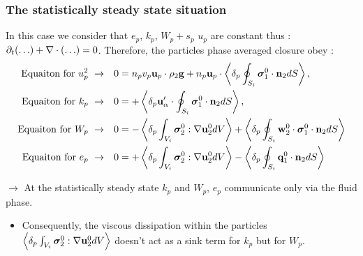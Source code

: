 \documentclass{sintefbeamer}
\begin{document}
\begin{frame}
  \frametitle{The statistically steady state situation}
In this case we consider that $e_p$, $k_p$, $W_p+s_p$ $u_p$ are constant thus : $\partial_t (\ldots) + \mathbf{\nabla}\cdot(\ldots) = 0$.
Therefore, the particles phase averaged closure obey :
\begin{align*}
  \text{Equaiton for $u_p^2$ } \to& \ \ \
  0
  = 
  n_p v_p \textbf{u}_p \cdot 
  \rho_2 \textbf{g}
  + n_p \textbf{u}_p \cdot \left<\delta_p \oint_{S_{i}} \bm{\sigma}_1^0 \cdot \textbf{n}_2 dS\right>,
  \\
  \text{Equaiton for $k_p$ } \to&\ \ \
  0
  = 
  + \left<\delta_p \textbf{u}_\alpha'\cdot\oint_{S_{i}} \bm{\sigma}_1^0 \cdot \textbf{n}_2 dS\right>,
  \\
  \text{Equaiton for $W_p$ } \to&\ \ \
  0
  = 
  - \left<\delta_p \int_{V_{i}} {\bm{\sigma}_2^0 : \mathbf{\nabla}\textbf{u}_2^0} dV\right>
  + \left<\delta_p \oint_{S_{i}} {\textbf{w}_2^0 \cdot \bm{\sigma}_1^0 \cdot  \textbf{n}_2} dS\right>\\
  \text{Equaiton for $e_p$ } \to&\ \ \
  0
  = 
  + \left<\delta_p \int_{V_{i}} {\bm{\sigma}_2^0 : \mathbf{\nabla}\textbf{u}_2^0} dV\right>
  - \left<\delta_p \oint_{S_{i}} {\textbf{q}_1^0\cdot \textbf{n}_2} dS\right>
\end{align*}
  
$\to$ At the statistically steady state $k_p$ and $W_p$, $e_p$ communicate only via the fluid phase. 
\begin{itemize}
  \item Consequently, the viscous dissipation within the particles $\left<\delta_p \int_{V_{i}} {\bm{\sigma}_2^0 : \mathbf{\nabla}\textbf{u}_2^0} dV\right>$ doesn't act as a sink term for $k_p$ but for $W_p$. 
\end{itemize}

\end{frame}
\end{document}
